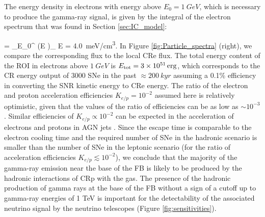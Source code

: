 The energy density in electrons with energy above $E_0 = \SI{1}{GeV}$, which is necessary to produce the gamma-ray signal, 
is given by the integral of the electron spectrum that was found in Section \ref{sec:IC_model}:

\be
{} = \int_{E_0}^{\infty} \left(E \right)_{\!\!\el} \de E = \SI{4.0}{meV/cm^3}.
\ee
In Figure \ref{fig:Particle_spectra} (right), we compare the corresponding flux to the local CRe flux.
The total energy content of the ROI in electrons above $\SI{1}{GeV}$ is $E_{\text{tot}} = \SI{3e51}{erg}$, which corresponds to the CR energy output of 3000 SNe in the past $\approx \SI{200}{kyr}$ assuming a 0.1\% efficiency in converting the SNR kinetic energy to CRe energy.
The ratio of the electron and proton acceleration efficiencies $K_{e/p} = 10^{-2}$ assumed here is relatively optimistic,
given that the values of the ratio of efficiencies can be as low as $\sim 10^{-3}$ \citep[e.g.,][]{2015PhRvL.114h5003P}.
Similar efficiencies of $K_{e/p} \propto 10^{-2}$ can be expected in the acceleration of 
electrons and protons in AGN jets \citep[e.g.,][]{2018arXiv180305556B}.
Since the escape time is comparable to the electron cooling time and the required number of SNe in the hadronic
scenario is smaller than the number of SNe in the leptonic scenario (for the ratio of acceleration efficiencies $K_{e/p} \lesssim 10^{-2}$),
we conclude that the majority of the gamma-ray emission near the base of the FB 
is likely to be produced by the hadronic interactions of CRp with the gas.
The presence of the hadronic production of gamma rays at the base of the FB without a sign of a cutoff up to gamma-ray energies
of 1 TeV is important for the detectability of the associated neutrino signal by the neutrino telescopes (Figure \ref{fig:sensitivities}).

